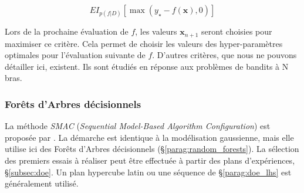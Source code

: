 \begin{equation} \label{eq:ei}
{EI}_{p(f | D)}\left[\max \left(y_{\star}-f(\boldsymbol{x}), 0\right)\right]
\end{equation}

Lors de la prochaine évaluation de $f$, les valeurs $\boldsymbol{x}_{n+1}$ seront choisies pour maximiser ce critère.
Cela permet de choisir les valeurs des hyper-paramètres optimales pour l'évaluation suivante de $f$.
D'autres critères, que nous ne pouvons détailler ici, existent.
Ils sont étudiés en réponse aux problèmes de bandits à N bras.


\subsubsection{Forêts d'Arbres décisionnels} \label{subsubsec:rf_opt}
La méthode \textit{SMAC} (\textit{Sequential Model-Based Algorithm Configuration}) est proposée par \citeauthor{hutter_sequential_2011} \cite{hutter_sequential_2011}.
La démarche est identique à la modélisation gaussienne, mais elle utilise ici des Forêts d'Arbres décisionnels (§\ref{parag:random_forests}).
La sélection des premiers essais à réaliser peut être effectuée à partir des plans d'expériences, §\ref{subsec:doe}.
Un plan hypercube latin ou une séquence de \citeauthor{sobol_distribution_1967} §\ref{parag:doe_lhs} est généralement utilisé.

